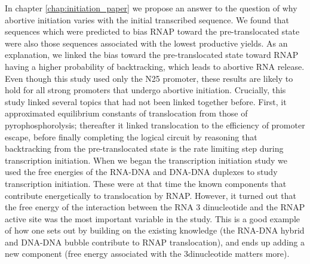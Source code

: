In chapter \ref{chap:initiation_paper} we propose an answer to the question of
why abortive initiation varies with the initial transcribed sequence. We found
that sequences which were predicted to bias RNAP toward the pre-translocated
state were also those sequences associated with the lowest productive yields.
As an explanation, we linked the bias toward the pre-translocated state toward
RNAP having a higher probability of backtracking, which leads to abortive RNA
release. Even though this study used only the N25 promoter, these results are
likely to hold for all strong promoters that undergo abortive initiation.
Crucially, this study linked several topics that had not been linked together
before. First, it approximated equilibrium constants of translocation from
those of pyrophosphorolysis; thereafter it linked translocation to the
efficiency of promoter escape, before finally completing the logical circuit by
reasoning that backtracking from the pre-translocated state is the rate
limiting step during transcription initiation. When we began the transcription
initiation study we used the free energies of the RNA-DNA and DNA-DNA duplexes
to study transcription initiation.  These were at that time the known
components that contribute energetically to translocation by RNAP. However, it
turned out that the free energy of the interaction between the RNA 3\ppp
dinucleotide and the RNAP active site was the most important variable in the
study. This is a good example of how one sets out by building on the existing
knowledge (the RNA-DNA hybrid and DNA-DNA bubble contribute to RNAP
translocation), and ends up adding a new component (free energy associated with
the 3\ppp dinucleotide matters more).

